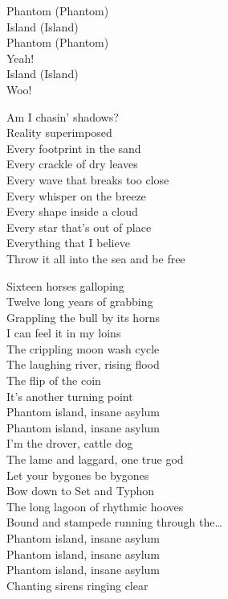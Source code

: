 Phantom (Phantom)\\
Island (Island)\\
Phantom (Phantom)\\
Yeah!\\
Island (Island)\\
Woo!\\


Am I chasin' shadows?\\
Reality superimposed\\
Every footprint in the sand\\
Every crackle of dry leaves\\
Every wave that breaks too close\\
Every whisper on the breeze\\
Every shape inside a cloud\\
Every star that's out of place\\
Everything that I believe\\
Throw it all into the sea and be free\\


Sixteen horses galloping\\
Twelve long years of grabbing\\
Grappling the bull by its horns\\
I can feel it in my loins\\
The crippling moon wash cycle\\
The laughing river, rising flood\\
The flip of the coin\\
It's another turning point\\

Phantom island, insane asylum\\
Phantom island, insane asylum\\
I'm the drover, cattle dog\\
The lame and laggard, one true god\\

Let your bygones be bygones\\
Bow down to Set and Typhon\\
The long lagoon of rhythmic hooves\\
Bound and stampede running through the…\\

Phantom island, insane asylum\\
Phantom island, insane asylum\\
Phantom island, insane asylum\\
Chanting sirens ringing clear\\

